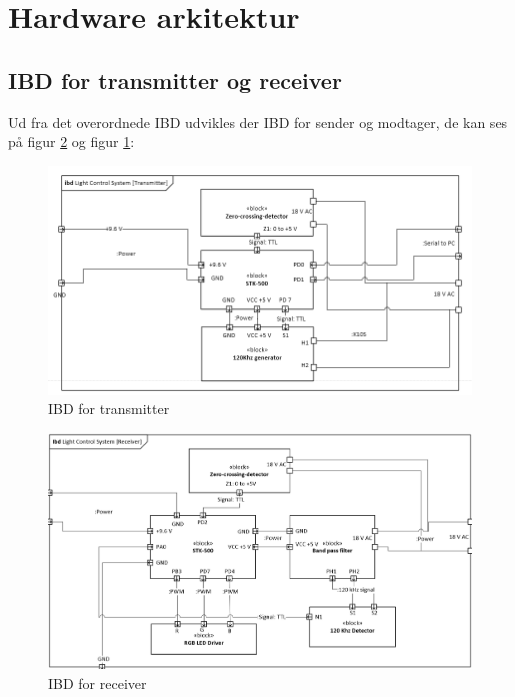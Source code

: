 \documentclass[oneside]{memoir}
\begin{document}
\section{Hardware arkitektur}

\subsection{IBD for transmitter og receiver}
Ud fra det overordnede IBD udvikles der IBD for sender og modtager, de kan ses på figur \ref{fig:IBDreceiver} og figur \ref{fig:IBDtransmitter}:

\begin{figure}[H]
\centering
\includegraphics[width=0.8\linewidth]{"billeder til latex/IBDtransmitter"}
\caption{IBD for transmitter}
\label{fig:IBDtransmitter}
\end{figure}
\begin{figure}[H]
\centering
\includegraphics[width=0.8\linewidth]{"billeder til latex/IBDreceiver"}
\caption{IBD for receiver}
\label{fig:IBDreceiver}
\end{figure}
\end{document}

